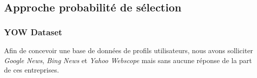 
    \subsection{Approche probabilité de sélection}    
        \subsubsection{YOW Dataset}
        Afin de concevoir une base de données de profils utilisateurs, nous avons solliciter \emph{Google News}, \emph{Bing News} et \emph{Yahoo Webscope} mais sans aucune réponse de la part de ces entreprises. 

